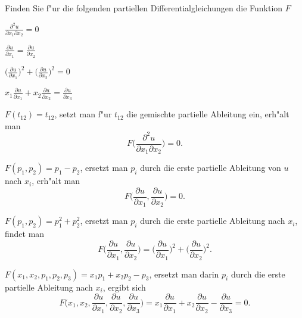 Finden Sie f"ur die folgenden partiellen Differentialgleichungen die
Funktion $F$
\begin{teilaufgaben}
\item $\displaystyle\frac{\partial^2 u}{\partial x_1\partial x_2}=0$
\item $\displaystyle\frac{\partial u}{\partial x_1}=\frac{\partial u}{\partial x_2}$
\item $\displaystyle
\biggl(\frac{\partial u}{\partial x_1}\biggr)^2+
\biggl(\frac{\partial u}{\partial x_2}\biggr)^2=0$
\item $\displaystyle
x_1\frac{\partial u}{\partial x_1}+
x_2\frac{\partial u}{\partial x_2}=\frac{\partial u}{\partial x_3}$
\end{teilaufgaben}

\begin{loesung}
\begin{teilaufgaben}
\item $F(t_{12})=t_{12}$, setzt man f"ur $t_{12}$ die gemischte partielle
Ableitung ein, erh"alt man
\[
F\biggl(\frac{\partial^2 u}{\partial x_1\partial x_2}\biggr)=0.
\]
\item
$F(p_1,p_2)=p_1-p_2$, ersetzt man $p_i$ durch die erste 
partielle Ableitung von $u$ nach $x_i$, erh"alt man
\[
F\biggl(\frac{\partial u}{\partial x_1},\frac{\partial u}{\partial x_2}\biggr)=0.
\]
\item
$F(p_1,p_2)=p_1^2+p_2^2$, ersetzt man $p_i$ durch die erste partielle
Ableitung nach $x_i$, findet man
\[
F\biggl(
\frac{\partial u}{\partial x_1},
\frac{\partial u}{\partial x_2}
\biggr)
=
\biggl(\frac{\partial u}{\partial x_1}\biggr)^2+
\biggl(\frac{\partial u}{\partial x_2}\biggr)^2.
\]
\item
$F(x_1,x_2,p_1,p_2,p_3)=x_1p_1+x_2p_2-p_3$, ersetzt man darin $p_i$ durch
die erste partielle Ableitung nach $x_i$, ergibt sich
\[
F\biggl(x_1,x_2,
\frac{\partial u}{\partial x_1},
\frac{\partial u}{\partial x_2},
\frac{\partial u}{\partial x_3}\biggr)=
x_1\frac{\partial u}{\partial x_1}+
x_2\frac{\partial u}{\partial x_2}-\frac{\partial u}{\partial x_3}=0.
\]
\end{teilaufgaben}
\end{loesung}
